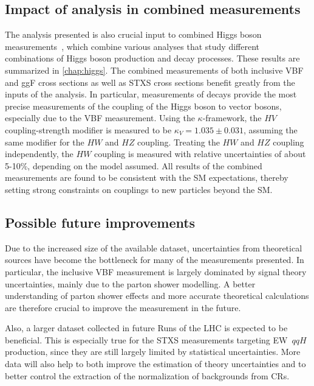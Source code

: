 \subsection{Impact of analysis in combined measurements}
The analysis presented is also crucial input to combined Higgs boson measurements~\cite{NaturePaper}, which combine various analyses that study different combinations of Higgs boson production and decay processes. These results are summarized in \cref{chap:higgs}.
The combined measurements of both inclusive VBF and ggF cross sections as well as STXS cross sections benefit greatly from the inputs of the \HWW analysis.
In particular, measurements of \HWW decays provide the most precise measurements of the coupling of the Higgs boson to vector bosons, especially due to the VBF measurement.
Using the $\kappa$-framework, the $HV$ coupling-strength modifier is measured to be $\kappa_{V} = 1.035 \pm 0.031$, assuming the same modifier for the $HW$ and $HZ$ coupling.
Treating the $HW$ and $HZ$ coupling independently, the $HW$ coupling is measured with relative uncertainties of about 5-10\%, depending on the model assumed. 
All results of the combined measurements are found to be consistent with the SM expectations, thereby setting strong constraints on couplings to new particles beyond the SM.  

\subsection{Possible future improvements}
Due to the increased size of the available dataset, uncertainties from theoretical sources have become the bottleneck for many of the \HWW measurements presented.
In particular, the inclusive VBF measurement is largely dominated by signal theory uncertainties, mainly due to the parton shower modelling.
A better understanding of parton shower effects and more accurate theoretical calculations are therefore crucial to improve the measurement in the future.~\cite{Jger2020} 

Also, a larger dataset collected in future Runs of the LHC is expected to be beneficial. This is especially true for the STXS measurements targeting EW~$qqH$ production, since they are still largely limited by statistical uncertainties. 
More data will also help to both improve the estimation of theory uncertainties and to better control the extraction of the normalization of backgrounds from CRs. 


